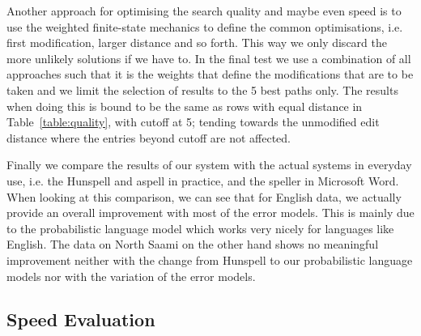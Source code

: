 \documentclass[a4paper,12pt]{article}
\begin{document}
Another approach for optimising the search quality and maybe even speed is to
use the weighted finite-state mechanics to define the common optimisations,
i.e. first modification, larger distance and so forth. This way we only discard
the more unlikely solutions if we have to. In the final test we use a
combination of all approaches such that it is the weights that define the
modifications that are to be taken and we limit the selection of results to the
5 best paths only. The results when doing this is bound to be the same as rows
with equal distance in Table~\ref{table:quality}, with cutoff at 5; tending
towards the unmodified edit distance where the entries beyond cutoff are not
affected.

%

Finally we compare the results of our system with the actual systems in
everyday use, i.e. the Hunspell and aspell in practice, and the speller in
Microsoft Word. When looking at this comparison, we can see that for English
data, we actually provide an overall improvement with most of the error models.
This is mainly due to the probabilistic language model which works very nicely
for languages like English. The data on North Saami on the other hand shows no
meaningful improvement neither with the change from Hunspell to our
probabilistic language models nor with the variation of the error models.

%


\subsection{Speed Evaluation}
\end{document}
